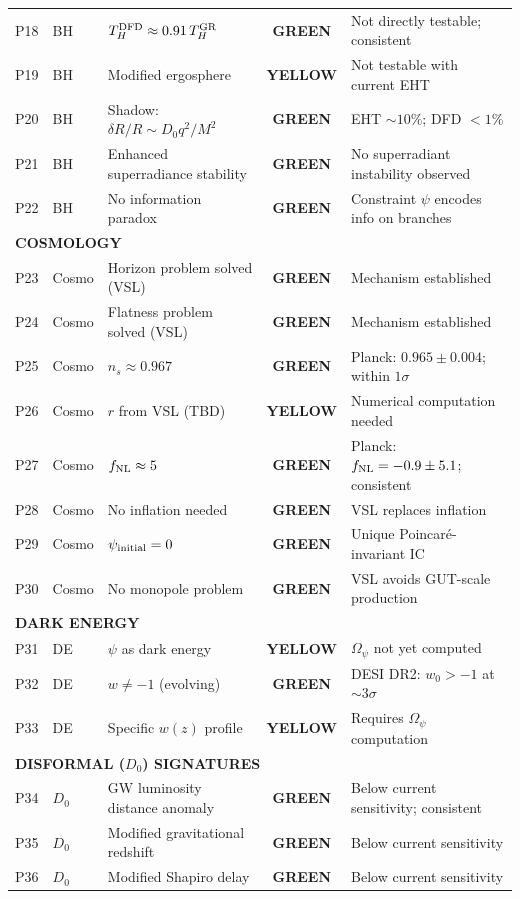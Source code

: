 \documentclass[11pt,a4paper]{article}
\newcommand{\GREEN}{\textcolor{dfdgreen}{\textbf{GREEN}}}
\newcommand{\YELLOW}{\textcolor{dfdyellow}{\textbf{YELLOW}}}
\begin{document}
\begin{center}
\begin{longtable}{clp{5.5cm}cl}
P18 & BH & $T_H^{\rm DFD} \approx 0.91\,T_H^{\rm GR}$ & \GREEN & Not directly testable; consistent \\
P19 & BH & Modified ergosphere & \YELLOW & Not testable with current EHT \\
P20 & BH & Shadow: $\delta R/R \sim D_0 q^2/M^2$ & \GREEN & EHT $\sim 10\%$; DFD $< 1\%$ \\
P21 & BH & Enhanced superradiance stability & \GREEN & No superradiant instability observed \\
P22 & BH & No information paradox & \GREEN & Constraint $\psi$ encodes info on branches \\
\midrule
\multicolumn{5}{l}{\textbf{COSMOLOGY}} \\
\midrule
P23 & Cosmo & Horizon problem solved (VSL) & \GREEN & Mechanism established \\
P24 & Cosmo & Flatness problem solved (VSL) & \GREEN & Mechanism established \\
P25 & Cosmo & $n_s \approx 0.967$ & \GREEN & Planck: $0.965 \pm 0.004$; within $1\sigma$ \\
P26 & Cosmo & $r$ from VSL (TBD) & \YELLOW & Numerical computation needed \\
P27 & Cosmo & $f_{\rm NL} \approx 5$ & \GREEN & Planck: $f_{\rm NL} = -0.9 \pm 5.1$; consistent \\
P28 & Cosmo & No inflation needed & \GREEN & VSL replaces inflation \\
P29 & Cosmo & $\psi_{\rm initial} = 0$ & \GREEN & Unique Poincar\'e-invariant IC \\
P30 & Cosmo & No monopole problem & \GREEN & VSL avoids GUT-scale production \\
\midrule
\multicolumn{5}{l}{\textbf{DARK ENERGY}} \\
\midrule
P31 & DE & $\psi$ as dark energy & \YELLOW & $\Omega_\psi$ not yet computed \\
P32 & DE & $w \neq -1$ (evolving) & \GREEN & DESI DR2: $w_0 > -1$ at $\sim 3\sigma$ \\
P33 & DE & Specific $w(z)$ profile & \YELLOW & Requires $\Omega_\psi$ computation \\
\midrule
\multicolumn{5}{l}{\textbf{DISFORMAL ($D_0$) SIGNATURES}} \\
\midrule
P34 & $D_0$ & GW luminosity distance anomaly & \GREEN & Below current sensitivity; consistent \\
P35 & $D_0$ & Modified gravitational redshift & \GREEN & Below current sensitivity \\
P36 & $D_0$ & Modified Shapiro delay & \GREEN & Below current sensitivity \\

\end{longtable}
\end{center}
\end{document}
